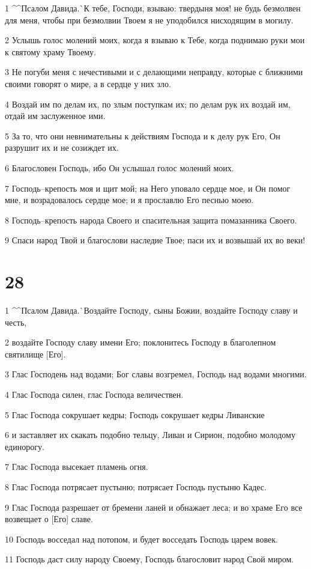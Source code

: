 \par 1 ^^Псалом Давида.^^ К тебе, Господи, взываю: твердыня моя! не будь безмолвен для меня, чтобы при безмолвии Твоем я не уподобился нисходящим в могилу.
\par 2 Услышь голос молений моих, когда я взываю к Тебе, когда поднимаю руки мои к святому храму Твоему.
\par 3 Не погуби меня с нечестивыми и с делающими неправду, которые с ближними своими говорят о мире, а в сердце у них зло.
\par 4 Воздай им по делам их, по злым поступкам их; по делам рук их воздай им, отдай им заслуженное ими.
\par 5 За то, что они невнимательны к действиям Господа и к делу рук Его, Он разрушит их и не созиждет их.
\par 6 Благословен Господь, ибо Он услышал голос молений моих.
\par 7 Господь--крепость моя и щит мой; на Него уповало сердце мое, и Он помог мне, и возрадовалось сердце мое; и я прославлю Его песнью моею.
\par 8 Господь--крепость народа Своего и спасительная защита помазанника Своего.
\par 9 Спаси народ Твой и благослови наследие Твое; паси их и возвышай их во веки!

\chapter{28}

\par 1 ^^Псалом Давида.^^ Воздайте Господу, сыны Божии, воздайте Господу славу и честь,
\par 2 воздайте Господу славу имени Его; поклонитесь Господу в благолепном святилище [Его].
\par 3 Глас Господень над водами; Бог славы возгремел, Господь над водами многими.
\par 4 Глас Господа силен, глас Господа величествен.
\par 5 Глас Господа сокрушает кедры; Господь сокрушает кедры Ливанские
\par 6 и заставляет их скакать подобно тельцу, Ливан и Сирион, подобно молодому единорогу.
\par 7 Глас Господа высекает пламень огня.
\par 8 Глас Господа потрясает пустыню; потрясает Господь пустыню Кадес.
\par 9 Глас Господа разрешает от бремени ланей и обнажает леса; и во храме Его все возвещает о [Его] славе.
\par 10 Господь восседал над потопом, и будет восседать Господь царем вовек.
\par 11 Господь даст силу народу Своему, Господь благословит народ Свой миром.

